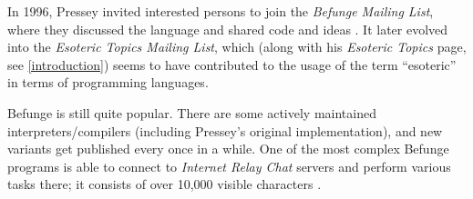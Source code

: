 In 1996, Pressey invited interested persons to join the \emph{Befunge Mailing List}, where they discussed the language and shared code and ideas \cite{pressey1996welcome}. It later evolved into the \emph{Esoteric Topics Mailing List}, which (along with his \emph{Esoteric Topics} page, see \cref{introduction}) seems to have contributed to the usage of the term “esoteric” in terms of programming languages.

Befunge is still quite popular. There are some actively maintained interpreters/compilers (including Pressey's original implementation), and new variants get published every once in a while. One of the most complex Befunge programs is able to connect to \emph{Internet Relay Chat} servers and perform various tasks there; it consists of over 10,000 visible characters \cite{kallasjoki2008fungot}.
